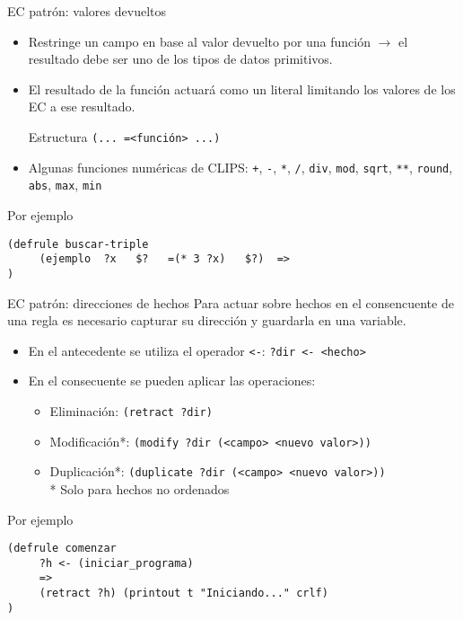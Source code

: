\documentclass[usenames,dvipsnames,aspectratio=169]{beamer}
\begin{document}
\begin{frame}[fragile]{EC patrón: valores devueltos}
	\begin{itemize}
		\item Restringe un campo en base al valor devuelto por una función $\rightarrow$ el resultado debe ser uno de los tipos de datos primitivos.
		\item El resultado de la función actuará como un literal limitando los valores de los EC a ese resultado.
		\begin{block}{Estructura}
			\texttt{(... =<función> ...)}
		\end{block}
		\item Algunas funciones numéricas de CLIPS: \texttt{+}, \texttt{-}, \texttt{*}, \texttt{/}, \texttt{div}, \texttt{mod}, \texttt{sqrt}, \texttt{**}, \texttt{round}, \texttt{abs}, \texttt{max}, \texttt{min}
	\end{itemize}
	\begin{exampleblock}{\small Por ejemplo}
		\footnotesize
		\begin{verbatim}
(defrule buscar-triple
     (ejemplo  ?x   $?   =(* 3 ?x)   $?)  =>
)
		\end{verbatim}
	\end{exampleblock}
\end{frame}

\begin{frame}[fragile]{EC patrón: direcciones de hechos}
	 Para actuar sobre hechos en el consencuente de una regla es necesario capturar su dirección y guardarla en una variable.
	\begin{itemize}
		\item En el antecedente se utiliza el operador \texttt{<-}: \texttt{?dir <- <hecho>}
		\item En el consecuente se pueden aplicar las operaciones:
		\begin{itemize}
			\item Eliminación: \texttt{(retract ?dir)}
			\item Modificación*: \texttt{(modify ?dir (<campo> <nuevo valor>))}
			\item Duplicación*: \texttt{(duplicate ?dir (<campo> <nuevo valor>))}\\
			* Solo para hechos no ordenados
		\end{itemize}
	\end{itemize}
	\begin{exampleblock}{\footnotesize Por ejemplo}
		\scriptsize
		\begin{verbatim}
(defrule comenzar
     ?h <- (iniciar_programa)
     =>
     (retract ?h) (printout t "Iniciando..." crlf)
)
		\end{verbatim}
	\end{exampleblock}
\end{frame}
\end{document}
